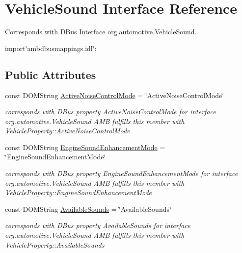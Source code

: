 \hypertarget{interfaceVehicleSound}{\section{Vehicle\+Sound Interface Reference}
\label{interfaceVehicleSound}
}


Corresponds with D\+Bus Interface org.\+automotive.\+Vehicle\+Sound.  




{\ttfamily import\char`\"{}ambdbusmappings.\+idl\char`\"{};}

\subsection*{Public Attributes}
\begin{DoxyCompactItemize}
\item 
\hypertarget{interfaceVehicleSound_ab6d041f63822291727e44ad63e532493}{const D\+O\+M\+String \hyperlink{interfaceVehicleSound_ab6d041f63822291727e44ad63e532493}{Active\+Noise\+Control\+Mode} = \char`\"{}Active\+Noise\+Control\+Mode\char`\"{}}\label{interfaceVehicleSound_ab6d041f63822291727e44ad63e532493}

\begin{DoxyCompactList}\small\item\em corresponds with D\+Bus property Active\+Noise\+Control\+Mode for interface org.\+automotive.\+Vehicle\+Sound A\+M\+B fulfills this member with Vehicle\+Property\+::\+Active\+Noise\+Control\+Mode \end{DoxyCompactList}\item 
\hypertarget{interfaceVehicleSound_a8178afad26fff3ab300014500ddf2176}{const D\+O\+M\+String \hyperlink{interfaceVehicleSound_a8178afad26fff3ab300014500ddf2176}{Engine\+Sound\+Enhancement\+Mode} = \char`\"{}Engine\+Sound\+Enhancement\+Mode\char`\"{}}\label{interfaceVehicleSound_a8178afad26fff3ab300014500ddf2176}

\begin{DoxyCompactList}\small\item\em corresponds with D\+Bus property Engine\+Sound\+Enhancement\+Mode for interface org.\+automotive.\+Vehicle\+Sound A\+M\+B fulfills this member with Vehicle\+Property\+::\+Engine\+Sound\+Enhancement\+Mode \end{DoxyCompactList}\item 
\hypertarget{interfaceVehicleSound_ae97af33f75e780803d882d0391ffa33f}{const D\+O\+M\+String \hyperlink{interfaceVehicleSound_ae97af33f75e780803d882d0391ffa33f}{Available\+Sounds} = \char`\"{}Available\+Sounds\char`\"{}}\label{interfaceVehicleSound_ae97af33f75e780803d882d0391ffa33f}

\begin{DoxyCompactList}\small\item\em corresponds with D\+Bus property Available\+Sounds for interface org.\+automotive.\+Vehicle\+Sound A\+M\+B fulfills this member with Vehicle\+Property\+::\+Available\+Sounds \end{DoxyCompactList}\end{DoxyCompactItemize}


